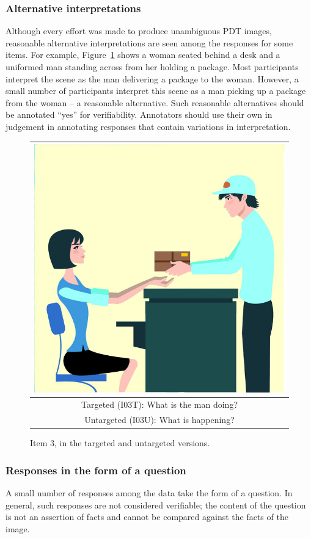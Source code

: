\documentclass[12pt,notitlepage]{article}
\begin{document}
\subsubsection{Alternative interpretations} Although every effort was made to produce unambiguous PDT images, reasonable alternative interpretations are seen among the responses for some items. For example, Figure~\ref{fig:deliver-package} shows a woman seated behind a desk and a uniformed man standing across from her holding a package. Most participants interpret the scene as the man delivering a package to the woman. However, a small number of participants interpret this scene as a man picking up a package from the woman -- a reasonable alternative. Such reasonable alternatives should be annotated ``yes'' for verifiability. Annotators should use their own in judgement in annotating responses that contain variations in interpretation.

\begin{figure}[h]
\begin{center}
\begin{tabular}{|c|}
\hline
\includegraphics[width=0.4\columnwidth,trim=0 0 0 -3]{figures/I03.jpg}\\
\hline
Targeted (I03T): What is the man doing?\\
\hline
Untargeted (I03U): What is happening? \\
\hline
\end{tabular}
\end{center}
\caption{Item 3, in the targeted and untargeted versions.}
\label{fig:deliver-package}
\end{figure}

\subsubsection{Responses in the form of a question} \label{subsubsec:verif-question} A small number of responses among the data take the form of a question. In general, such responses are not considered verifiable; the content of the question is not an assertion of facts and cannot be compared against the facts of the image. 
\end{document}

